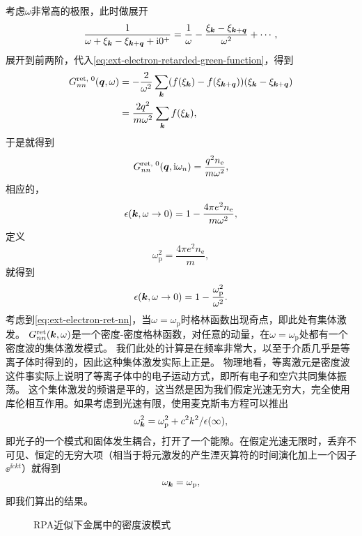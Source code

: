 考虑$\omega$非常高的极限，此时做展开
\[
    \frac{1}{\omega + \xi_{\vb*{k}} - \xi_{\vb*{k} + \vb*{q}} + \mathrm{i} 0^+} = \frac{1}{\omega} - \frac{\xi_{\vb*{k}} - \xi_{\vb*{k} + \vb*{q}}}{\omega^2} + \cdots,
\]
展开到前两阶，代入\eqref{eq:ext-electron-retarded-green-function}，得到
\[
    \begin{aligned}
        G_{nn}^\text{ret, 0}(\vb*{q}, \omega) &= - \frac{2}{\omega^2} \sum_{\vb*{k}} (f(\xi_{\vb*{k}}) - f(\xi_{\vb*{k} + \vb*{q}})) (\xi_{\vb*{k}} - \xi_{\vb*{k} + \vb*{q}}) \\
        &= \frac{2 q^2}{m \omega^2} \sum_{\vb*{k}} f(\xi_{\vb*{k}}), 
    \end{aligned}
\]
于是就得到
\begin{equation}
    G_{nn}^\text{ret, 0}(\vb*{q}, \mathrm{i} \omega_n) = \frac{q^2 n_\text{e}}{m \omega^2},
\end{equation}
相应的，
\[
    \epsilon(\vb*{k}, \omega \to 0) = 1 - \frac{4 \pi e^2 n_\text{e}}{m \omega^2},
\]
定义
\begin{equation}
    \omega_\text{p}^2 = \frac{4 \pi e^2 n_\text{e}}{m},
\end{equation}
就得到
\begin{equation}
    \epsilon(\vb*{k}, \omega \to 0) = 1 - \frac{\omega_\text{p}^2}{\omega^2}.
\end{equation}
考虑到\eqref{eq:ext-electron-ret-nn}，当$\omega = \omega_\text{p}$时格林函数出现奇点，即此处有集体激发。
$G^\text{ret}_{nn}(\vb*{k}, \omega)$是一个密度-密度格林函数，对任意的动量，在$\omega = \omega_\text{p}$处都有一个密度波的集体激发模式。
我们此处的计算是在频率非常大，以至于介质几乎是等离子体时得到的，因此这种集体激发实际上正是。
物理地看，等离激元是密度波这件事实际上说明了等离子体中的电子运动方式，即所有电子和空穴共同集体振荡。
这个集体激发的频谱是平的，这当然是因为我们假定光速无穷大，完全使用库伦相互作用。如果考虑到光速有限，使用麦克斯韦方程可以推出
\begin{equation}
    \omega_{\vb*{k}}^2 = \omega_\text{p}^2 + c^2 k^2 / \epsilon(\infty),
\end{equation}
即光子的一个模式和固体发生耦合，打开了一个能隙。在假定光速无限时，丢弃不可见、恒定的无穷大项（相当于将元激发的产生湮灭算符的时间演化加上一个因子$\ee^{\ii c k t}$）就得到
\[
    \omega_{\vb*{k}} = \omega_\text{p},
\]
即我们算出的结果。

\begin{figure}
    \centering
    
    \caption{RPA近似下金属中的密度波模式}
    \label{fig:rpa-density-modes}
\end{figure}

